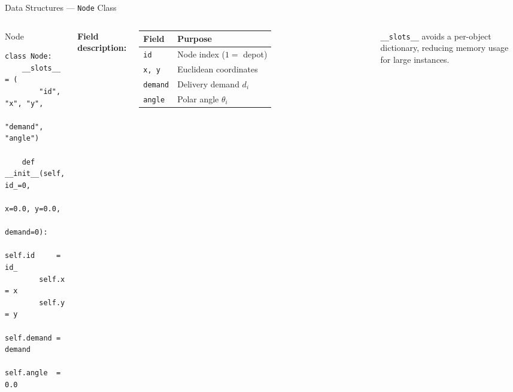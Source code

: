 \documentclass{beamer}
\begin{document}
\begin{frame}[fragile,shrink=12]{Data Structures — \texttt{Node} Class}

\begin{columns}[T]

\begin{block}{Node}
\begin{lstlisting}
class Node:
    __slots__ = (
        "id", "x", "y",
        "demand", "angle")

    def __init__(self, id_=0,
                 x=0.0, y=0.0,
                 demand=0):
        self.id     = id_
        self.x      = x
        self.y      = y
        self.demand = demand
        self.angle  = 0.0
\end{lstlisting}
\end{block}

\small
\textbf{Field description:}

\vspace{0.3em}
\begin{tabular}{ll}
\toprule
Field & Purpose \\
\midrule
\texttt{id}     & Node index ($1 =$ depot) \\
\texttt{x, y}   & Euclidean coordinates \\
\texttt{demand} & Delivery demand $d_i$ \\
\texttt{angle}  & Polar angle $\theta_i$ \\
\bottomrule
\end{tabular}

\vspace{0.5em}
\footnotesize
\texttt{\_\_slots\_\_} avoids a per-object dictionary, reducing memory usage for large instances.
\end{columns}

\end{frame}
\end{document}
